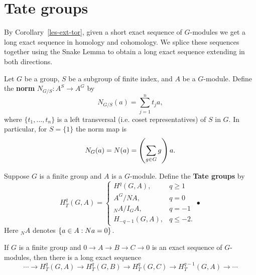 \section{Tate groups}
By Corollary~\ref{les-ext-tor}, given a short exact sequence of $G$-modules we get a long exact sequence in homology and cohomology. We splice these sequences together using the Snake Lemma to obtain a long exact sequence extending in both directions.
\begin{df}
Let $G$ be a group, $S$ be a subgroup of finite index, and $A$ be a $G$-module. Define the \textbf{norm} $N_{G/S}:A^S\to A^G$ by 
\[
N_{G/S}(a)=\sum_{j=1}^n t_ja,
\]
where $\{t_1,\ldots, t_n\}$ is a left transversal (i.e. coset representatives) of $S$ in $G$. In particular, for $S=\{1\}$ the norm map is
\[
N_G(a)=N(a)=\left( {\sum_{g\in G} g} \right)a.
\]
\end{df}
\begin{df}
Suppose $G$ is a finite group and $A$ is a $G$-module. 
Define the \textbf{Tate groups} by
\[
H_T^q(G,A)
=\begin{cases}
H^q(G,A),&q\ge 1\\
A^G/NA,&q=0\\
{}_NA/ I_GA, &q=-1\\
H_{-q-1}(G,A),& q\le -2.
\end{cases}•
\] 
Here ${}_NA$ denotes $\left\{{a\in A}:{Na=0}\right\}$.
\end{df}
\begin{thm}
If $G$ is a finite group and $0\to A\to B\to C\to 0$ is an exact sequence of $G$-modules, then there is a long exact sequence
\[
\cdots \to H_T^q(G,A)\to H_T^q(G,B)\to H_T^q(G,C) \to H_T^{q-1}(G,A)\to \cdots
\]
\end{thm}
